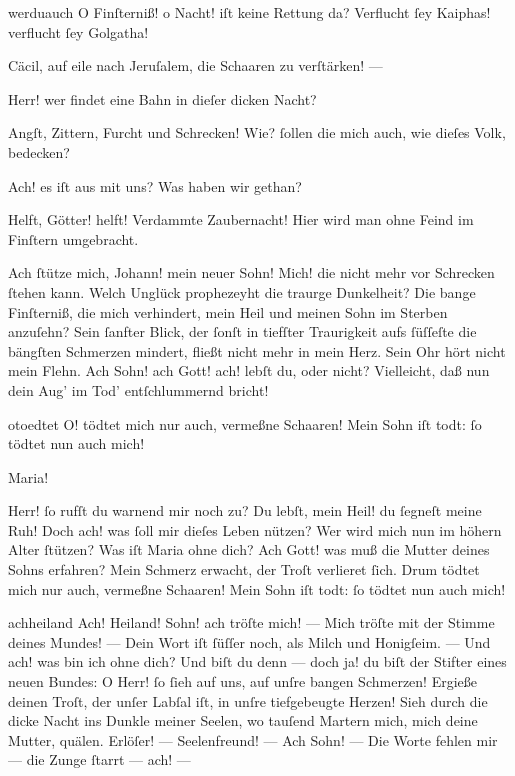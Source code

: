 \documentclass{ees}
\begin{document}
{\begin{movement}{werduauch}
    O Finſterniß! o Nacht! iſt keine Rettung da?
    Verflucht ſey Kaiphas! verflucht ſey Golgatha!

    Cäcil, auf eile nach Jeruſalem,
    die Schaaren zu verſtärken! —

    \hspace*{3cm}Herr! wer findet eine Bahn
    in dieſer dicken Nacht?

    \hspace*{3cm}Angſt, Zittern, Furcht und Schrecken!
    Wie? ſollen die mich auch, wie dieſes Volk, bedecken?

    Ach! es iſt aus mit uns? Was haben wir gethan?

    Helft, Götter! helft! Verdammte Zaubernacht!
    Hier wird man ohne Feind im Finſtern umgebracht.

    \voice[Maria]
    Ach ſtütze mich, Johann! mein neuer Sohn!
    Mich! die nicht mehr vor Schrecken ſtehen kann.
    Welch Unglück prophezeyht die traurge Dunkelheit?
    Die bange Finſterniß, die mich verhindert,
    mein Heil und meinen Sohn im Sterben anzuſehn?
    Sein ſanfter Blick, der ſonſt in tiefſter Traurigkeit
    aufs ſüſſeſte die bängſten Schmerzen mindert,
    fließt nicht mehr in mein Herz. Sein Ohr hört nicht mein Flehn.
    Ach Sohn! ach Gott! ach! lebſt du, oder nicht?
    Vielleicht, daß nun dein Aug’ im Tod’ entſchlummernd bricht!
  \end{movement}

  \begin{movement}{otoedtet}
    \voice[Maria]
    O! tödtet mich nur auch, vermeßne Schaaren!
    Mein Sohn iſt todt: ſo tödtet nun auch mich!

    \voice[Jeſus]
    Maria!

    \voice[Maria]
    Herr! ſo rufſt du warnend mir noch zu?
    Du lebſt, mein Heil! du ſegneſt meine Ruh!
    Doch ach! was ſoll mir dieſes Leben nützen?
    Wer wird mich nun im höhern Alter ſtützen?
    Was iſt Maria ohne dich?
    Ach Gott! was muß die Mutter deines Sohns erfahren?
    Mein Schmerz erwacht, der Troſt verlieret ſich.
    Drum tödtet mich nur auch, vermeßne Schaaren!
    Mein Sohn iſt todt: ſo tödtet nun auch mich!
  \end{movement}

  \begin{movement}{achheiland}
    \voice[Maria]
    Ach! Heiland! Sohn! ach tröſte mich! —
    Mich tröſte mit der Stimme deines Mundes! —
    Dein Wort iſt ſüſſer noch, als Milch und Honigſeim. —
    Und ach! was bin ich ohne dich?
    Und biſt du denn — doch ja! du biſt
    der Stifter eines neuen Bundes:
    O Herr! ſo ſieh auf uns, auf unſre bangen Schmerzen!
    Ergieße deinen Troſt, der unſer Labſal iſt,
    in unſre tiefgebeugte Herzen!
    Sieh durch die dicke Nacht ins Dunkle meiner Seelen,
    wo tauſend Martern mich, mich deine Mutter, quälen.
    Erlöſer! — Seelenfreund! — Ach Sohn! — Die Worte fehlen mir —
    die Zunge ſtarrt — ach! —


\end{movement}}
\end{document}
